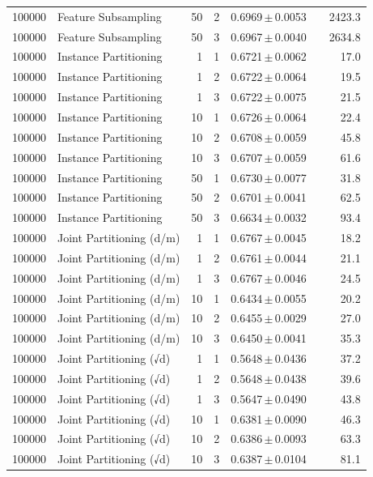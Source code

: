 \begin{table}[ht]
\begin{tabular}{rlrrccr}
100000 & Feature Subsampling & 50 & 2 & 0.6969\,$\pm$\,0.0053 &  & 2423.3 \\
100000 & Feature Subsampling & 50 & 3 & 0.6967\,$\pm$\,0.0040 &  & 2634.8 \\
100000 & Instance Partitioning & 1 & 1 & 0.6721\,$\pm$\,0.0062 &  & 17.0 \\
100000 & Instance Partitioning & 1 & 2 & 0.6722\,$\pm$\,0.0064 &  & 19.5 \\
100000 & Instance Partitioning & 1 & 3 & 0.6722\,$\pm$\,0.0075 &  & 21.5 \\
100000 & Instance Partitioning & 10 & 1 & 0.6726\,$\pm$\,0.0064 &  & 22.4 \\
100000 & Instance Partitioning & 10 & 2 & 0.6708\,$\pm$\,0.0059 &  & 45.8 \\
100000 & Instance Partitioning & 10 & 3 & 0.6707\,$\pm$\,0.0059 &  & 61.6 \\
100000 & Instance Partitioning & 50 & 1 & 0.6730\,$\pm$\,0.0077 &  & 31.8 \\
100000 & Instance Partitioning & 50 & 2 & 0.6701\,$\pm$\,0.0041 &  & 62.5 \\
100000 & Instance Partitioning & 50 & 3 & 0.6634\,$\pm$\,0.0032 &  & 93.4 \\
100000 & Joint Partitioning (d/m) & 1 & 1 & 0.6767\,$\pm$\,0.0045 &  & 18.2 \\
100000 & Joint Partitioning (d/m) & 1 & 2 & 0.6761\,$\pm$\,0.0044 &  & 21.1 \\
100000 & Joint Partitioning (d/m) & 1 & 3 & 0.6767\,$\pm$\,0.0046 &  & 24.5 \\
100000 & Joint Partitioning (d/m) & 10 & 1 & 0.6434\,$\pm$\,0.0055 &  & 20.2 \\
100000 & Joint Partitioning (d/m) & 10 & 2 & 0.6455\,$\pm$\,0.0029 &  & 27.0 \\
100000 & Joint Partitioning (d/m) & 10 & 3 & 0.6450\,$\pm$\,0.0041 &  & 35.3 \\
100000 & Joint Partitioning (√d) & 1 & 1 & 0.5648\,$\pm$\,0.0436 &  & 37.2 \\
100000 & Joint Partitioning (√d) & 1 & 2 & 0.5648\,$\pm$\,0.0438 &  & 39.6 \\
100000 & Joint Partitioning (√d) & 1 & 3 & 0.5647\,$\pm$\,0.0490 &  & 43.8 \\
100000 & Joint Partitioning (√d) & 10 & 1 & 0.6381\,$\pm$\,0.0090 &  & 46.3 \\
100000 & Joint Partitioning (√d) & 10 & 2 & 0.6386\,$\pm$\,0.0093 &  & 63.3 \\
100000 & Joint Partitioning (√d) & 10 & 3 & 0.6387\,$\pm$\,0.0104 &  & 81.1 \\

\end{tabular}
\end{table}
